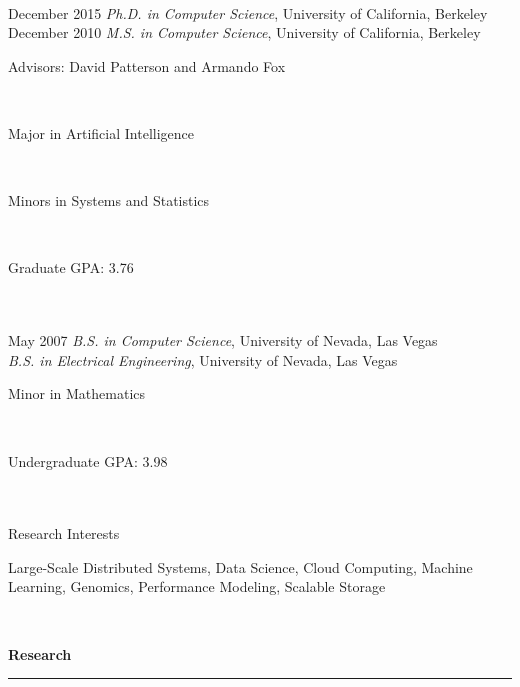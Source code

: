 \documentclass[11pt]{article}
\newcommand{\parwidthNarrow}{4.8 in}
\newcommand{\tabwidthWide}{2.0 in}
\newcommand{\head}[1]{
{\bf #1} \\
\rule{\textwidth}{0.01 in}

\vspace{-0.35 in}

}
\begin{document}
\begin{tabbing}
\hspace{\tabwidthWide} \= \\ 

December 2015 \> \emph{Ph.D. in Computer Science}, University of California, Berkeley \\ 
December 2010 \> \emph{M.S. in Computer Science}, University of California, Berkeley \\ 
\> \parbox[t]{\parwidthNarrow}{Advisors: David Patterson and Armando Fox } \\ 
\> \parbox[t]{\parwidthNarrow}{Major in Artificial Intelligence} \\
\> \parbox[t]{\parwidthNarrow}{Minors in Systems and Statistics} \\
\> \parbox[t]{\parwidthNarrow}{Graduate GPA: 3.76} \\ \\

May 2007 \> \emph{B.S. in Computer Science}, University of Nevada, Las Vegas \\ 
\> \emph{B.S. in Electrical Engineering}, University of Nevada, Las Vegas \\ 
\> \parbox[t]{\parwidthNarrow}{Minor in Mathematics} \\
\> \parbox[t]{\parwidthNarrow}{Undergraduate GPA: 3.98} \\ \\

Research Interests \> \parbox[t]{\parwidthNarrow}{
Large-Scale Distributed Systems, Data Science, Cloud Computing, Machine Learning, Genomics, Performance Modeling, Scalable Storage
} \\

\end{tabbing}



\head{Research}
\end{document}
